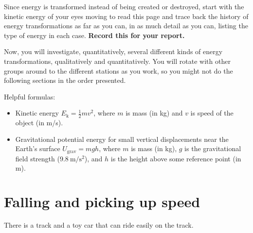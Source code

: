 
\begin{steps}
	\item Since energy is transformed instead of being created or destroyed, start with the kinetic energy of your eyes moving to read this page and trace back the history of energy transformations as far as you can, in as much detail as you can, listing the type of energy in each case. \textbf{Record this for your report.}
\end{steps}

\begin{framed}
Now, you will investigate, quantitatively, several different kinds of energy transformations, qualitatively and quantitatively. You will rotate with other groups around to the different stations as you work, so you might not do the following sections in the order presented.
\end{framed}

Helpful formulas:
\begin{itemize}
	\item Kinetic energy $E_\textrm{k} = \frac{1}{2} m v^2$, where $m$ is mass (in kg) and $v$ is speed of the object (in m/s).
	
	\item Gravitational potential energy for small vertical displacements near the Earth's surface $U_\textrm{grav} = m g h$, where $m$ is mass (in kg), $g$ is the gravitational field strength ($9.8\:\textrm{m}/\textrm{s}^2$), and $h$ is the height above some reference point (in m).
\end{itemize}

\section{Falling and picking up speed}

There is a track and a toy car that can ride easily on the track.

